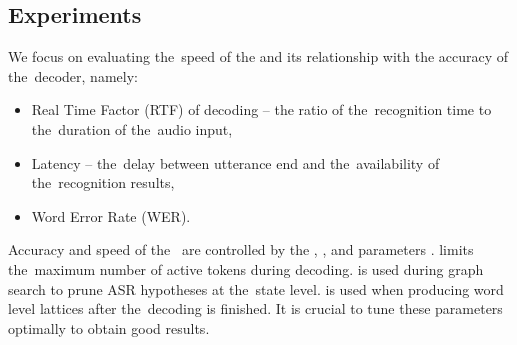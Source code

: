 
\subsection{Experiments}



We focus on evaluating the~speed of the  and its relationship with the accuracy of the~decoder, namely:
\begin{itemize}
    \item Real Time Factor (RTF) of decoding -- the ratio of the~recognition time to the~duration of the~audio input,
    \item Latency -- the~delay between utterance end and the~availability of the~recognition results,
    \item Word Error Rate (WER).
\end{itemize}



Accuracy and speed of the~ are controlled by the ,   , and  parameters \cite{povey2011kaldi}.
 limits the~maximum number of active tokens during decoding.
 is used during graph search to prune ASR hypotheses at the~state level.
 is used when producing word level lattices after the~decoding is finished.
It is crucial to tune these parameters optimally to obtain good results.

